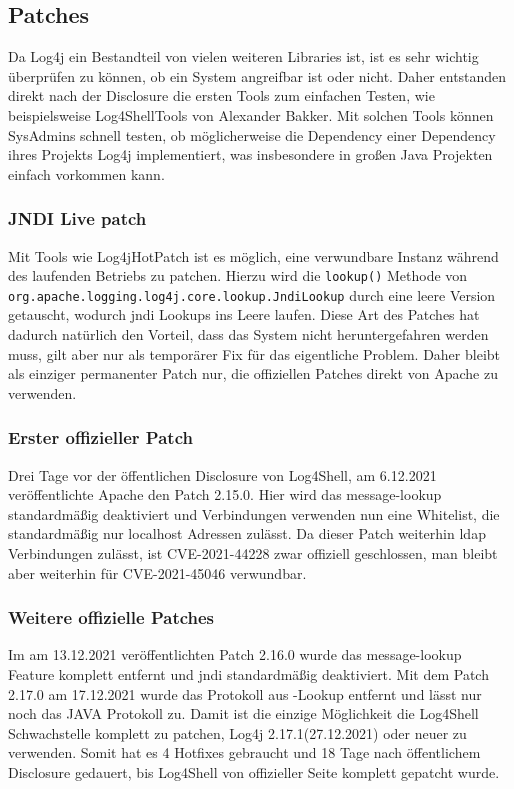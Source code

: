 
\subsection{Patches}\label{subsec:patches}
Da Log4j ein Bestandteil von vielen weiteren Libraries ist, ist es sehr wichtig überprüfen zu können, ob ein System angreifbar ist oder nicht.
Daher entstanden direkt nach der Disclosure die ersten Tools zum einfachen Testen, wie beispielsweise Log4ShellTools von Alexander Bakker.
Mit solchen Tools können SysAdmins schnell testen, ob möglicherweise die Dependency einer Dependency ihres Projekts Log4j implementiert, was insbesondere in großen Java Projekten einfach vorkommen kann.

\subsubsection{JNDI Live patch}
Mit Tools wie Log4jHotPatch ist es möglich, eine verwundbare Instanz während des laufenden Betriebs zu patchen.
Hierzu wird die \verb|lookup()| Methode von \verb|org.apache.logging.log4j.core.lookup.JndiLookup| durch eine leere Version getauscht, wodurch \gls{jndi} Lookups ins Leere laufen.
Diese Art des Patches hat dadurch natürlich den Vorteil, dass das System nicht heruntergefahren werden muss, gilt aber nur als temporärer Fix für das eigentliche Problem.
Daher bleibt als einziger permanenter Patch nur, die offiziellen Patches direkt von Apache zu verwenden.

\subsubsection{Erster offizieller Patch}
Drei Tage vor der öffentlichen Disclosure von Log4Shell, am 6.12.2021 veröffentlichte Apache den Patch 2.15.0.
Hier wird das message-lookup standardmäßig deaktiviert und  Verbindungen verwenden nun eine Whitelist, die standardmäßig nur localhost Adressen zulässt.
Da dieser Patch weiterhin \gls{ldap} Verbindungen zulässt, ist CVE-2021-44228 zwar offiziell geschlossen, man bleibt aber weiterhin für CVE-2021-45046 verwundbar.

\subsubsection{Weitere offizielle Patches}
Im am 13.12.2021 veröffentlichten Patch 2.16.0 wurde das message-lookup Feature komplett entfernt und \gls{jndi} standardmäßig deaktiviert.
Mit dem Patch 2.17.0 am 17.12.2021 wurde das  Protokoll aus -Lookup entfernt und lässt nur noch das JAVA Protokoll zu.
Damit ist die einzige Möglichkeit die Log4Shell Schwachstelle komplett zu patchen, Log4j 2.17.1(27.12.2021) oder neuer zu verwenden.
Somit hat es 4 Hotfixes gebraucht und 18 Tage nach öffentlichem Disclosure gedauert, bis Log4Shell von offizieller Seite komplett gepatcht wurde.
